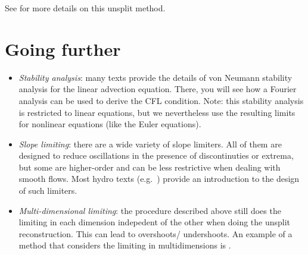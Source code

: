 See \cite{colella:1990} for more details on this unsplit method.


\section{Going further}

\begin{itemize}
\item {\em Stability analysis}: many texts provide the details of von
  Neumann stability analysis for the linear advection equation.
  There, you will see how a Fourier analysis can be used to derive the
  CFL condition.  Note: this stability analysis is restricted to
  linear equations, but we nevertheless use the resulting limits for
  nonlinear equations (like the Euler equations).

\item {\em Slope limiting}: there are a wide variety of slope limiters.
  All of them are designed to reduce oscillations in the presence
  of discontinuties or extrema, but some are higher-order and can be
  less restrictive when dealing with smooth flows.  Most hydro
  texts (e.g.\ \cite{leveque:2002,toro:1997}) provide an introduction to the design
  of such limiters.

\item {\em Multi-dimensional limiting}: the procedure described above
  still does the limiting in each dimension indepedent of the other
  when doing the unsplit reconstruction.  This can lead to overshoots/
  undershoots.  An example of a method that considers the limiting
  in multidimensions is \cite{BDS,quadBDS}.

\end{itemize}

